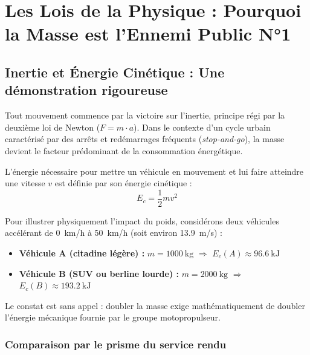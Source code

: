 \documentclass[12pt, a4paper]{article}
\begin{document}
\section{Les Lois de la Physique : Pourquoi la Masse est l'Ennemi Public N°1}

\subsection{Inertie et Énergie Cinétique : Une démonstration rigoureuse}

Tout mouvement commence par la victoire sur l'inertie, principe régi par la deuxième loi de Newton ($F = m \cdot a$). Dans le contexte d'un cycle urbain caractérisé par des arrêts et redémarrages fréquents (\textit{stop-and-go}), la masse devient le facteur prédominant de la consommation énergétique.

L'énergie nécessaire pour mettre un véhicule en mouvement et lui faire atteindre une vitesse $v$ est définie par son énergie cinétique :
\begin{equation}
    E_c = \frac{1}{2} m v^2
    \label{eq:ec}
\end{equation}

Pour illustrer physiquement l'impact du poids, considérons deux véhicules accélérant de \SI{0}{\kilo\meter/\hour} à \SI{50}{\kilo\meter/\hour} (soit environ \SI{13.9}{\meter/\second}) :
\begin{itemize}
    \item \textbf{Véhicule A (citadine légère) :} $m = \SI{1000}{\kilogram}$ $\Rightarrow$ $E_c(A) \approx \SI{96.6}{\kilo\joule}$
    \item \textbf{Véhicule B (SUV ou berline lourde) :} $m = \SI{2000}{\kilogram}$ $\Rightarrow$ $E_c(B) \approx \SI{193.2}{\kilo\joule}$
\end{itemize}

Le constat est sans appel : doubler la masse exige mathématiquement de doubler l'énergie mécanique fournie par le groupe motopropulseur.

\subsubsection{Comparaison par le prisme du service rendu}
\end{document}
